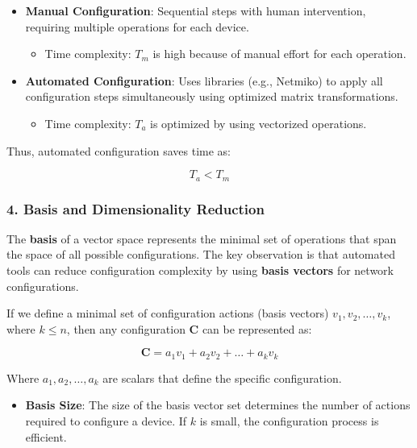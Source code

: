 \documentclass[11pt]{article}
\providecommand{\tightlist}{%
      \setlength{\itemsep}{0pt}\setlength{\parskip}{0pt}}
\begin{document}
\begin{itemize}
\tightlist
\item
  \textbf{Manual Configuration}: Sequential steps with human
  intervention, requiring multiple operations for each device.

  \begin{itemize}
  \tightlist
  \item
    Time complexity: \(T_m\) is high because of manual effort for each
    operation.
  \end{itemize}
\item
  \textbf{Automated Configuration}: Uses libraries (e.g., Netmiko) to
  apply all configuration steps simultaneously using optimized matrix
  transformations.

  \begin{itemize}
  \tightlist
  \item
    Time complexity: \(T_a\) is optimized by using vectorized
    operations.
  \end{itemize}
\end{itemize}

Thus, automated configuration saves time as:

\[
T_a < T_m
\]

\hypertarget{basis-and-dimensionality-reduction}{%
\subsubsection{4. Basis and Dimensionality
Reduction}\label{basis-and-dimensionality-reduction}}

The \textbf{basis} of a vector space represents the minimal set of
operations that span the space of all possible configurations. The key
observation is that automated tools can reduce configuration complexity
by using \textbf{basis vectors} for network configurations.

If we define a minimal set of configuration actions (basis vectors)
\(v_1, v_2, \dots, v_k\), where \(k \leq n\), then any configuration
\(\mathbf{C}\) can be represented as:

\[
\mathbf{C} = a_1 v_1 + a_2 v_2 + \dots + a_k v_k
\]

Where \(a_1, a_2, \dots, a_k\) are scalars that define the specific
configuration.

\begin{itemize}
\tightlist
\item
  \textbf{Basis Size}: The size of the basis vector set determines the
  number of actions required to configure a device. If \(k\) is small,
  the configuration process is efficient.
\end{itemize}
\end{document}
